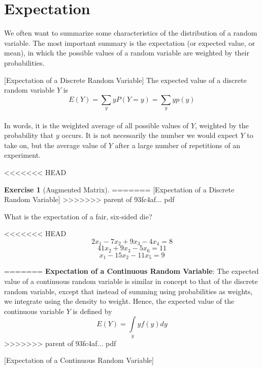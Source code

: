 \documentclass[]{book}
\theoremstyle{definition}
\theoremstyle{definition}
\theoremstyle{definition}
\newtheorem{exercise}{Exercise}[chapter]
\theoremstyle{remark}
\begin{document}
\hypertarget{expectation}{%
\section{Expectation}\label{expectation}}

We often want to summarize some characteristics of the distribution of a random variable. The most important summary is the expectation (or expected value, or mean), in which the possible values of a random variable are weighted by their probabilities.

[Expectation of a Discrete Random Variable]
\protect\hypertarget{def:unnamed-chunk-83}{}{\label{def:unnamed-chunk-83} {} }The expected value of a discrete random variable \(Y\) is \[E(Y)=\sum\limits_{y} y P(Y=y)= \sum\limits_{y} y p(y)\]\\
In words, it is the weighted average of all possible values of \(Y\), weighted by the probability that \(y\) occurs. It is not necessarily the number we would expect \(Y\) to take on, but the average value of \(Y\) after a large number of repetitions of an experiment.

<<<<<<< HEAD
\begin{exercise}[Augmented Matrix]
\protect\hypertarget{exr:augmatrix}{}{\label{exr:augmatrix} {} }
=======
[Expectation of a Discrete Random Variable]
\protect\hypertarget{exm:expectdiscrete}{}{\label{exm:expectdiscrete} {} }
>>>>>>> parent of 93fc4af... pdf

What is the expectation of a fair, six-sided die?

<<<<<<< HEAD
\[2x_1 -7x_2 + 9x_3 -4x_4 = 8\]
\[41x_2 + 9x_3 -5x_6 = 11\]
\[x_1 -15x_2 -11x_5 = 9\]
\end{exercise}
=======
\textbf{Expectation of a Continuous Random Variable}: The expected
value of a continuous random variable is similar in concept to that of
the discrete random variable, except that instead of summing using
probabilities as weights, we integrate using the density to weight.
Hence, the expected value of the continuous variable \(Y\) is defined by
\[E(Y)=\int\limits_{y} y f(y) dy\]
>>>>>>> parent of 93fc4af... pdf

[Expectation of a Continuous Random Variable]
\protect\hypertarget{exm:expectconti}{}{\label{exm:expectconti} {} }
\end{document}
